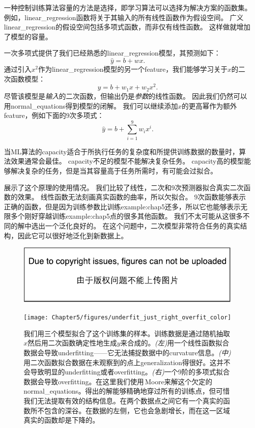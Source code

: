 一种控制训练算法容量的方法是选择，即学习算法可以选择为解决方案的函数集。
例如，\gls{linear_regression}函数将关于其输入的所有线性函数作为假设空间。
广义\gls{linear_regression}的假设空间包括多项式函数，而非仅有线性函数。
这样做就增加了模型的容量。

一次多项式提供了我们已经熟悉的\gls{linear_regression}模型，其预测如下：
\begin{equation}
    \hat{y} = b + wx.
\end{equation}
通过引入$x^2$作为\gls{linear_regression}模型的另一个\gls{feature}，我们能够学习关于$x$的二次函数模型：
\begin{equation}
    \hat{y} = b + w_1x + w_2x^2.
\end{equation}
尽管该模型是\emph{输入}的二次函数，但输出仍是\emph{参数}的线性函数。
因此我们仍然可以用\gls{normal_equations}得到模型的闭解。
我们可以继续添加$x$的更高幂作为额外\gls{feature}，例如下面的$9$次多项式：
\begin{equation}
    \hat{y} = b + \sum_{i=1}^9 w_i x^i.
\end{equation}

当\gls{ML}算法的\gls{capacity}适合于所执行任务的复杂度和所提供训练数据的数量时，算法效果通常会最佳。
\gls{capacity}不足的模型不能解决复杂任务。
\gls{capacity}高的模型能够解决复杂的任务，但是当其容量高于任务所需时，有可能会过拟合。

展示了这个原理的使用情况。
我们比较了线性，二次和$9$次预测器拟合真实二次函数的效果。
线性函数无法刻画真实函数的曲率，所以欠拟合。
$9$次函数能够表示正确的函数，但是因为训练参数比训练\gls{example:chap5}还多，所以它也能够表示无限多个刚好穿越训练\gls{example:chap5}点的很多其他函数。
我们不太可能从这很多不同的解中选出一个泛化良好的。
在这个问题中，二次模型非常符合任务的真实结构，因此它可以很好地泛化到新数据上。

\begin{figure}[!htb]
\ifOpenSource
\centerline{\includegraphics{figure.pdf}}
\else
\centerline{\texttt{[image: Chapter5/figures/underfit\_just\_right\_overfit\_color]}}
\fi
\caption{我们用三个模型拟合了这个训练集的样本。训练数据是通过随机抽取$x$然后用二次函数确定性地生成$y$来合成的。\emph{(左)}用一个线性函数拟合数据会导致\gls{underfitting}——它无法捕捉数据中的\gls{curvature}信息。\emph{(中)}用二次函数拟合数据在未观察到的点上\gls{generalization}得很好。这并不会导致明显的\gls{underfitting}或者\gls{overfitting}。\emph{(右)}一个$9$阶的多项式拟合数据会导致\gls{overfitting}。在这里我们使用\,\gls{Moore}来解这个欠定的\gls{normal_equations}。得出的解能够精确地穿过所有的训练点，但可惜我们无法提取有效的结构信息。在两个数据点之间它有一个真实的函数所不包含的深谷。在数据的左侧，它也会急剧增长，而在这一区域真实的函数却是下降的。}
\label{fig:chap5_underfit_just_right_overfit}
\end{figure}

